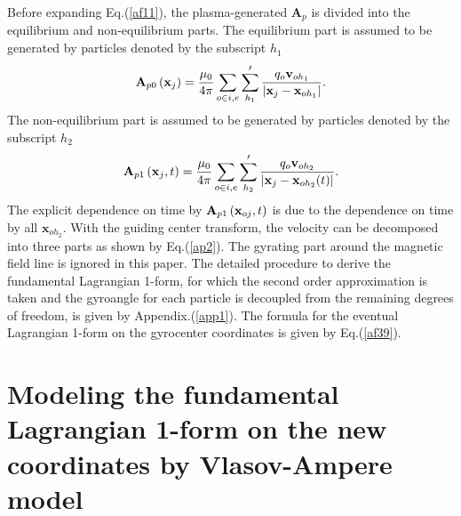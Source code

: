 \documentclass[12pt]{iopart}
\begin{document}
Before expanding Eq.(\ref{af11}), the plasma-generated $\mathbf{A}_{p}$ is divided into the equilibrium and non-equilibrium parts. The equilibrium part is assumed to be generated by particles denoted by the subscript $h_1$
\begin{equation}\label{af12}
{{\bf{A}}_{p0}}\left( {{{\bf{x}}_{j}}} \right) = \frac{{{\mu _0}}}{{4\pi }}\sum\limits_{o \in i,e} {\sum\limits_{{h_1}}' {\frac{{{q_o}{{\bf{v}}_{o{h_1}}}}}{{|{{\bf{x}}_{j}} - {{\bf{x}}_{o{h_1}}}|}}} }.
\end{equation}
The non-equilibrium part is assumed to be generated by particles denoted by the subscript $h_2$
\begin{equation}\label{af13}
{{\bf{A}}_{p1}}\left( {{{\bf{x}}_{j}}},t \right) = \frac{{{\mu _0}}}{{4\pi }}\sum\limits_{o \in i,e} {\sum\limits_{{h_2}}' {\frac{{{q_o}{{\bf{v}}_{o{h_2}}}}}{{|{{\bf{x}}_{j}} - {{\bf{x}}_{o{h_2}}}(t)|}}} }.
\end{equation}
The explicit dependence on time by ${{\bf{A}}_{p1}}\left( {{{\bf{x}}_{oj}}},t \right)$ is due to the dependence on time by all $\mathbf{x}_{oh_2}$.
With the guiding center transform, the velocity can be decomposed into three parts as shown by Eq.(\ref{ap2}). The gyrating part around the magnetic field line is ignored in this paper. The detailed procedure to derive the fundamental Lagrangian 1-form, for which the second order approximation is taken and the gyroangle for each particle is decoupled from the remaining degrees of freedom, is given by Appendix.(\ref{app1}). The formula for the eventual Lagrangian 1-form on the gyrocenter coordinates is given by Eq.(\ref{af39}).

\section{Modeling the fundamental Lagrangian 1-form on the new coordinates by Vlasov-Ampere model}\label{sec4}
\end{document}
